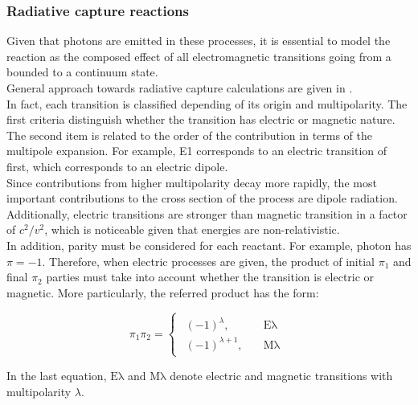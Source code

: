 \documentclass[openany]{book}
\begin{document}
\subsubsection{Radiative capture reactions}   \label{ssub:potential_calculations_radiativeCapture}

Given that photons are emitted in these processes, it is essential to model the reaction as the composed effect of  all electromagnetic transitions going from a bounded to a continuum state.  \\

General approach towards radiative capture calculations are given in \cite{goldhaber_weneser_1955}.\\

In fact, each transition is classified depending of its origin and multipolarity. The first criteria distinguish whether the transition has electric or magnetic nature. The second item is related to the order of the contribution in terms of the multipole expansion. For example, E1 corresponds to an electric transition of first, which corresponds to an electric dipole. \\

Since contributions from higher multipolarity decay more rapidly, the most important contributions to the cross section of the process are dipole radiation. Additionally, electric transitions are stronger than magnetic transition in a factor of $c^2/v^2$, which is noticeable given that energies are non-relativistic. \\

In addition, parity must be considered for each reactant. For example, photon has $\pi = -1$. Therefore, when electric processes are given, the product of initial $\pi_1$ and final $\pi_2$ parties must take into account whether the transition is electric or magnetic. More particularly, the referred product has the form: 

\begin{equation} \label{eq:radiativeCapture_parity}
	\pi_1 \pi_2 = 	\left\{\begin{array}{l}
		\begin{split}
			(-1)^{\lambda}, \quad & \mathrm{E\lambda} \\ 
			(-1)^{\lambda + 1}, \quad & \mathrm{M\lambda}
		\end{split}
	\end{array}\right.
\end{equation}

In the last equation, $\mathrm{E\lambda}$ and $\mathrm{M\lambda}$ denote electric and magnetic transitions with multipolarity $\lambda$. \\
\end{document}
